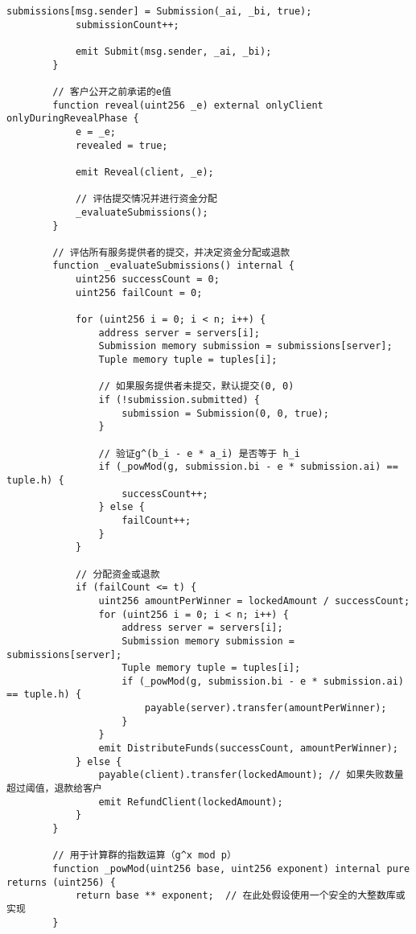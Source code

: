 \begin{lstlisting}[language=Solidity]
            submissions[msg.sender] = Submission(_ai, _bi, true);
            submissionCount++;
    
            emit Submit(msg.sender, _ai, _bi);
        }
    
        // 客户公开之前承诺的e值
        function reveal(uint256 _e) external onlyClient onlyDuringRevealPhase {
            e = _e;
            revealed = true;
    
            emit Reveal(client, _e);
    
            // 评估提交情况并进行资金分配
            _evaluateSubmissions();
        }
    
        // 评估所有服务提供者的提交，并决定资金分配或退款
        function _evaluateSubmissions() internal {
            uint256 successCount = 0;
            uint256 failCount = 0;
    
            for (uint256 i = 0; i < n; i++) {
                address server = servers[i];
                Submission memory submission = submissions[server];
                Tuple memory tuple = tuples[i];
    
                // 如果服务提供者未提交，默认提交(0, 0)
                if (!submission.submitted) {
                    submission = Submission(0, 0, true);
                }
    
                // 验证g^(b_i - e * a_i) 是否等于 h_i
                if (_powMod(g, submission.bi - e * submission.ai) == tuple.h) {
                    successCount++;
                } else {
                    failCount++;
                }
            }
    
            // 分配资金或退款
            if (failCount <= t) {
                uint256 amountPerWinner = lockedAmount / successCount;
                for (uint256 i = 0; i < n; i++) {
                    address server = servers[i];
                    Submission memory submission = submissions[server];
                    Tuple memory tuple = tuples[i];
                    if (_powMod(g, submission.bi - e * submission.ai) == tuple.h) {
                        payable(server).transfer(amountPerWinner);
                    }
                }
                emit DistributeFunds(successCount, amountPerWinner);
            } else {
                payable(client).transfer(lockedAmount); // 如果失败数量超过阈值，退款给客户
                emit RefundClient(lockedAmount);
            }
        }
    
        // 用于计算群的指数运算（g^x mod p）
        function _powMod(uint256 base, uint256 exponent) internal pure returns (uint256) {
            return base ** exponent;  // 在此处假设使用一个安全的大整数库或实现
        }
    

\end{lstlisting}
